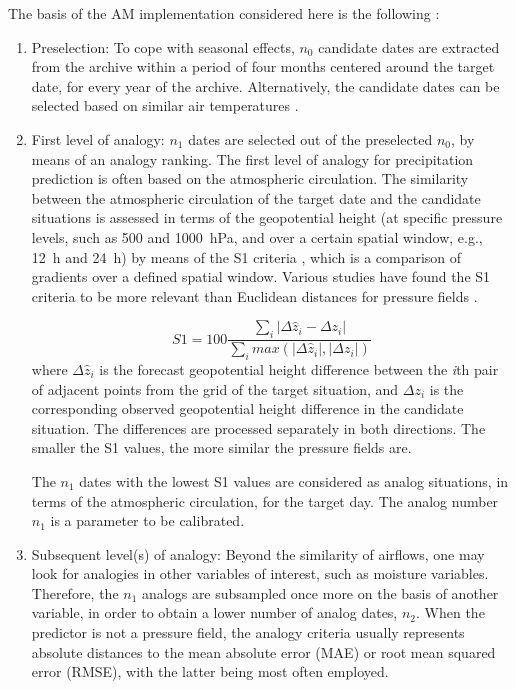 \documentclass{ametsoc}
\begin{document}
The basis of the AM implementation considered here is the following \citep[the same approach as][]{Guilbaud1997, Bontron2005, Marty2012, Horton2012, Radanovics2013, Chardon2014, Dayon2015, BenDaoud2016}:

\begin{enumerate}
	\item Preselection: To cope with seasonal effects, $n_{0}$ candidate dates are extracted from the archive within a period of four months centered around the target date, for every year of the archive. Alternatively, the candidate dates can be selected based on similar air temperatures \citep[see][]{BenDaoud2016}.
	
	\item First level of analogy: $n_{1}$ dates are selected out of the preselected $n_{0}$, by means of an analogy ranking. The first level of analogy for precipitation prediction is often based on the atmospheric circulation. The similarity between the atmospheric circulation of the target date and the candidate situations is assessed in terms of the geopotential height (at specific pressure levels, such as 500 and 1000~hPa, and over a certain spatial window, e.g., 12~h and 24~h) by means of the S1 criteria \citep[Eq. (\ref{eq:S1}), ][]{Teweles1954, Drosdowsky2003}, which is a comparison of gradients over a defined spatial window. Various studies have found the S1 criteria to be more relevant than Euclidean distances for pressure fields \citep{Wilson1980, Woodcock1980, Guilbaud1998, Bontron2004}.
	
	\begin{equation}
	\label{eq:S1}
	S1=100 \frac {\displaystyle \sum_{i} \vert \Delta\hat{z}_{i} - \Delta z_{i} \vert}
	{\displaystyle \sum_{i} max( \vert \Delta\hat{z}_{i} \vert , \vert \Delta z_{i} \vert ) }
	\end{equation}
	where $\Delta \hat{z}_{i}$ is the forecast geopotential height difference between the \textit{i}th pair of adjacent points from the grid of the target situation, and $\Delta z_{i}$ is the corresponding observed geopotential height difference in the candidate situation. The differences are processed separately in both directions. The smaller the S1 values, the more similar the pressure fields are.
	
	The $n_{1}$ dates with the lowest S1 values are considered as analog situations, in terms of the atmospheric circulation, for the target day. The analog number $n_{1}$ is a parameter to be calibrated.
	
	\item Subsequent level(s) of analogy: Beyond the similarity of airflows, one may look for analogies in other variables of interest, such as moisture variables. Therefore, the $n_{1}$ analogs are subsampled once more on the basis of another variable, in order to obtain a lower number of analog dates, $n_{2}$. When the predictor is not a pressure field, the analogy criteria usually represents absolute distances to the mean absolute error (MAE) or root mean squared error (RMSE), with the latter being most often employed.
	

\end{enumerate}
\end{document}
